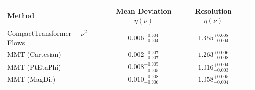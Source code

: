     \begin{tabular}{lccc}
        \toprule
        Method & Mean Deviation $\eta({\nu})$ & Resolution $\eta({\nu})$ \\
        \midrule
        CompactTransformer + $\nu^2$-Flows & $0.006^{+0.004}_{-0.004}$ & $1.355^{+0.008}_{-0.004}$ \\
        MMT (Cartesian) & $0.002^{+0.007}_{-0.007}$ & $1.263^{+0.006}_{-0.008}$ \\
        MMT (PtEtaPhi) & $0.008^{+0.005}_{-0.005}$ & $1.016^{+0.004}_{-0.003}$ \\
        MMT (MagDir) & $0.010^{+0.008}_{-0.006}$ & $1.058^{+0.005}_{-0.004}$ \\
        \bottomrule
    \end{tabular}